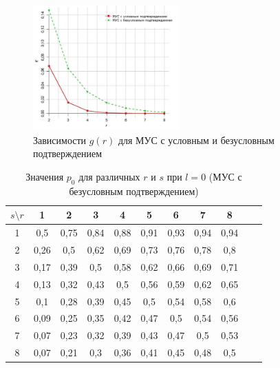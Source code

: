 \begin{figure}[!htbp]
\begin{center}
\centering
\includegraphics[width=0.5\textwidth]{pic/ParetoRjpg.pdf}
\end{center}
\caption{\label{pic:paretoR} Зависимости $g(r)$ для МУС с условным и безусловным подтверждением}
\end{figure}




\begin{table}[!h]
\centering
\begin{tabular}{|c|c|c|c|c|c|c|c|c|c|c|}
\hline
 $s \setminus  r$	&1&	2&	3&	4&	5&	6&	7&	8 \\ %
\hline
  1			&0,5	&0,75	&0,84	&0,88	&0,91	&0,93	&0,94	&0,94 \\ %
  2			&0,26	&0,5	&0,62	&0,69	&0,73	&0,76	&0,78	&0,8 \\ %
  3			&0,17	&0,39	&0,5	&0,58	&0,62	&0,66	&0,69	&0,71 \\ %
  4			&0,13	&0,32	&0,43	&0,5	&0,56	&0,59	&0,62	&0,65 \\ %
  5			&0,1	&0,28	&0,39	&0,45	&0,5	&0,54	&0,58	&0,6 \\ %
  6			&0,09	&0,25	&0,35	&0,42	&0,47	&0,5	&0,54	&0,56 \\ %
  7			&0,07	&0,23	&0,32	&0,39	&0,43	&0,47	&0,5	&0,53 \\ %
  8			&0,07	&0,21	&0,3	&0,36	&0,41	&0,45	&0,48	&0,5 \\ %
\hline
\end{tabular}
 \caption{\label{table:RSpNoConfirm} Значения $p_0$ для различных $r$ и $s$ при $l=0$ (МУС с безусловным подтверждением)}
\end{table}

